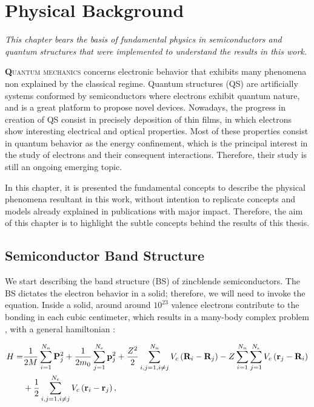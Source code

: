 \chapter{Physical Background }
\label{chap:Chapter-1}
\textit{This chapter bears the basis of fundamental physics in semiconductors and
quantum structures that were implemented to understand the results in this work.}
\vfill
\minitoc
\newpage

\lettrine[lines=3, lraise=.1, nindent=0mm, slope=0mm]{\textbf{Q}}{uantum mechanics}  concerns electronic behavior that exhibits many phenomena non explained by the classical regime. Quantum structures (QS) are artificially systems conformed by semiconductors where electrons exhibit quantum nature, and is a great platform to propose novel devices. Nowadays, the progress in creation of QS consist in precisely deposition of thin films, in which electrons show interesting electrical and optical properties\cite{sundram1991structures}. Most of these properties consist in quantum behavior  as the energy confinement, which is the principal interest in the study of electrons and their consequent interactions. Therefore,  their study is still an ongoing emerging topic. 

In this chapter, it is presented the fundamental concepts to describe the physical  phenomena resultant in this work, without intention to replicate concepts and models already explained in publications with major impact. Therefore, the aim of  this chapter is to highlight the subtle concepts behind the results of this thesis.

\section{Semiconductor Band Structure}
\label{sec:chapter-1-semiconductor}
\vspace{-10mm}
We start describing the band structure (\gls{BS}) of zincblende semiconductors. The \gls{BS} dictates the electron behavior in a solid; therefore, we will need to invoke the \sch equation. Inside a solid, around around $10^{23}$ valence electrons contribute to the bonding in each cubic centimeter,  which results in a many-body complex problem \cite{piprek2017handbook}, with a general hamiltonian \cite{alloul2010introduction,cardona2005fundamentals}: 

\begin{equation}
\begin{split}
	H  =  &\dfrac{1}{2M}\sum\limits_{i=1}^{N_{n}} \mathrm{\bf P}_{j}^{2} + \dfrac{1}{2m_{0}} \sum\limits_{j=1}^{N_{e}} \mathrm{\bf p}_{j}^{2} + \dfrac{Z^{2}}{2} \sum\limits_{i,j=1,i\neq j}^{N_{n}} V_{c}\left(\mathrm{\bf R}_{i}-\mathrm{\bf R}_{j}\right)-Z\sum\limits_{i=1}^{N_{n}}\sum\limits_{j=1}^{N_{e}}V_{c}\left(\mathrm{\bf r}_{j}-\mathrm{\bf R}_{i}\right) \\
	   & + \dfrac{1}{2} \sum\limits_{i,j=1,i\neq j}^{N_{e}} V_{c} \left(\mathrm{\bf r}_{i}-\mathrm{\bf r}_{j}\right),
\end{split}
\label{eq:chapter-1-solid-hamiltonian}
\end{equation}

